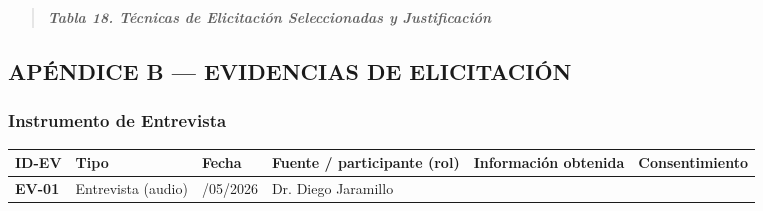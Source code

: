 \documentclass[
]{article}
\newcounter{none} %
\begin{document}
\begin{quote}
\protect{}\label{_bookmark74}{}\emph{\textbf{Tabla 18.
Técnicas de Elicitación Seleccionadas y Justificación}}
\end{quote}

\subsection{APÉNDICE B --- EVIDENCIAS DE
ELICITACIÓN}\label{apuxe9ndice-b-evidencias-de-elicitaciuxf3n}

\subsubsection{Instrumento de
Entrevista}\label{instrumento-de-entrevista}

{\def\LTcaptype{none} %
\begin{longtable}[]{@{}
  >{\raggedright\arraybackslash}p{}
  >{\raggedright\arraybackslash}p{}
  >{\centering\arraybackslash}p{}
  >{\raggedright\arraybackslash}p{}
  >{\raggedright\arraybackslash}p{}
  >{\raggedright\arraybackslash}p{}@{}}
\toprule\noalign{}
\begin{minipage}[b]{\linewidth}\raggedright
\textbf{ID-EV}
\end{minipage} & \begin{minipage}[b]{\linewidth}\centering
\textbf{Tipo}
\end{minipage} & \begin{minipage}[b]{\linewidth}\centering
\textbf{Fecha}
\end{minipage} & \begin{minipage}[b]{\linewidth}\raggedright
\textbf{Fuente / participante (rol)}
\end{minipage} & \begin{minipage}[b]{\linewidth}\raggedright
\textbf{Información obtenida}
\end{minipage} & \begin{minipage}[b]{\linewidth}\raggedright
\textbf{Consenti\-miento}
\end{minipage} \\
\midrule\noalign{}
\endhead
\bottomrule\noalign{}
\endlastfoot
\textbf{EV-01} & Entrevista (audio) & 23/05/2026 & Dr. Diego Jaramillo

\end{longtable}}
\end{document}
